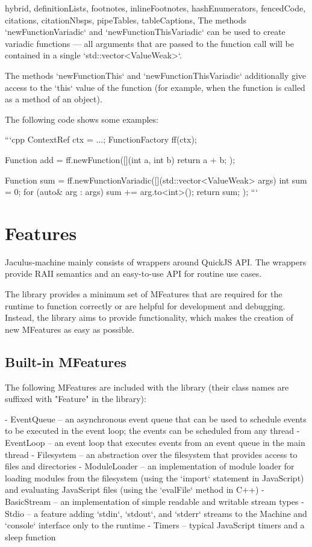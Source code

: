 \begin{markdown*}{%
  hybrid,
  definitionLists,
  footnotes,
  inlineFootnotes,
  hashEnumerators,
  fencedCode,
  citations,
  citationNbsps,
  pipeTables,
  tableCaptions,
}
The methods `newFunctionVariadic` and `newFunctionThisVariadic` can be used to create variadic functions --- all arguments that are passed to the function call will be contained in a single `std::vector<ValueWeak>`.

The methods `newFunctionThis` and `newFunctionThisVariadic` additionally give access to the `this` value of the function (for example, when the function is called as a method of an object).

The following code shows some examples:

```cpp
ContextRef ctx = ...;
FunctionFactory ff(ctx);

Function add = ff.newFunction([](int a, int b) { return a + b; });

Function sum = ff.newFunctionVariadic([](std::vector<ValueWeak> args) {
    int sum = 0;
    for (auto& arg : args) {
        sum += arg.to<int>();
    }
    return sum;
});
```


\section{Features}

Jaculus-machine mainly consists of wrappers around QuickJS API. The wrappers provide RAII semantics and an easy-to-use API for routine use cases.

The library provides a minimum set of MFeatures that are required for the runtime to function correctly or are helpful for development and debugging. Instead, the library aims to provide functionality, which makes the creation of new MFeatures as easy as possible.

\subsection{Built-in MFeatures}

The following MFeatures are included with the library (their class names are suffixed with "Feature" in the library):

  - EventQueue -- an asynchronous event queue that can be used to schedule events to be executed in the event loop; the events can be scheduled from any thread
  - EventLoop -- an event loop that executes events from an event queue in the main thread
  - Filesystem -- an abstraction over the filesystem that provides access to files and directories
  - ModuleLoader -- an implementation of module loader for loading modules from the filesystem (using the `import` statement in JavaScript) and evaluating JavaScript files (using the `evalFile` method in C++)
  - BasicStream -- an implementation of simple readable and writable stream types
  - Stdio -- a feature adding `stdin`, `stdout`, and `stderr` streams to the Machine and `console` interface only to the runtime
  - Timers -- typical JavaScript timers and a sleep function


\end{markdown*}
